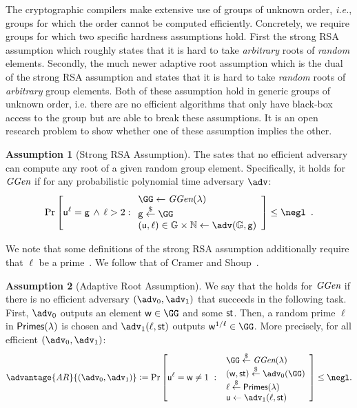 \documentclass{article}
\theoremstyle{definition}
\newtheorem{assumption}{Assumption}
\begin{document}
The cryptographic compilers make extensive use of groups of unknown order, \emph{i.e.}, groups for which the order cannot be computed efficiently.
Concretely, we require groups for which two specific hardness assumptions hold.
First the strong RSA assumption\cite{CCS:CraSho99} which roughly states that it is hard to take \emph{arbitrary} roots of \emph{random} elements. Secondly, the much newer adaptive root assumption\cite{EC:Wesolowski19} which is the dual of the strong RSA assumption and states that it is hard to take \emph{random} roots of \emph{arbitrary} group elements. 
Both of these assumption hold in generic groups of unknown order\cite{genericunknown,C:BonBunFis19}, i.e. there are no efficient algorithms that only have black-box access to the group but are able to break these assumptions. 
It is an open research problem to show whether one of these assumption implies the other.


\begin{assumption}[Strong RSA Assumption]
The  sates that no efficient adversary can compute any root of a given random group element. Specifically, it holds for $\textit{GGen}$ if for any probabilistic polynomial time adversary $\adv$:
\[
    \Pr\left[\gr{u}^\ell = \gr{g} \, \wedge \, \ell > 2:
    \begin{array}{l}
         \GG \leftarrow \ggen(\lambda)  \\
         \gr{g} \sample \GG \\
         (\gr{u}, \ell) \in \mathbb{G} \times \mathbb{N} \leftarrow \adv(\mathbb{G}, \gr{g}) \\
    \end{array}\right] \leq \negl \enspace .
\]
\end{assumption}
We note that some definitions of the strong RSA assumption additionally require that $\ell$ be a prime~\cite{EC:BarPfi97,journals/iacr/BonehBF18a}. We follow that of Cramer and Shoup~\cite{CCS:CraSho99}.

\begin{assumption}[Adaptive Root Assumption]
\label{assum:adaptiveroot}
We say that the  holds for $\textit{GGen}$ if 
there is no efficient adversary $(\adv_0,\adv_1)$ that succeeds 
in the following task.
First, $\adv_0$ outputs an element $\gr{w} \in \GG$ and some $\textsf{st}$.
Then, a random prime $\ell$ in $\textsf{Primes}(\lambda)$ is chosen
and $\adv_1(\ell,\state)$ outputs $\gr{w}^{1/\ell} \in \GG$.
More precisely, for all efficient $(\adv_0,\adv_1)$:
\[           \advantage{AR}{(\adv_0,\adv_1)}\deq 
                \Pr\left[\gr{u}^\ell = \gr{w} \neq 1 \ : \ 
                \begin{array}{l}
                      \GG \sample \ggen(\lambda) \\ 
                      (\gr{w},\state) \sample \adv_0(\GG) \\
                      \ell \sample \primes \\ 
                      \gr{u} \gets \adv_1(\ell, \state)
                \end{array} 
        \right] \leq \negl.
\]
\end{assumption}
\end{document}
